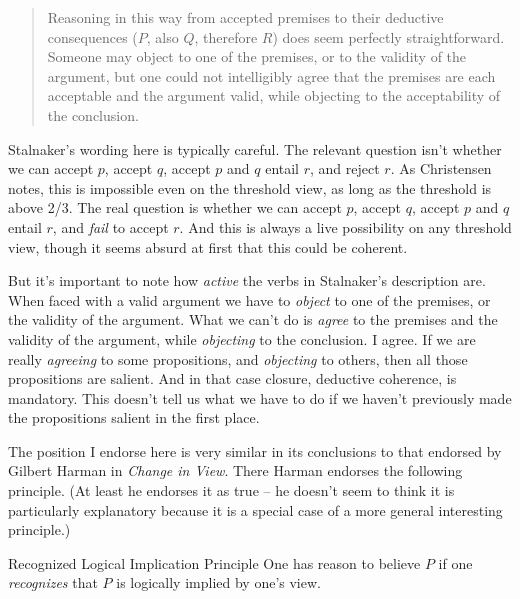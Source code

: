 \begin{quote}
Reasoning in this way from accepted premises to their deductive consequences (\(P\), also \(Q\), therefore \(R\)) does seem perfectly straightforward. Someone may object to one of the premises, or to the validity of the argument, but one could not intelligibly agree that the premises are each acceptable and the argument valid, while objecting to the acceptability of the conclusion. \cite[92]{Stalnaker1984}
\end{quote}

\noindent Stalnaker's wording here is typically careful. The relevant question isn't whether we can accept \(p\), accept \(q\), accept \(p\) and \(q\) entail \(r\), and reject \(r\). As Christensen \citeyearpar[Ch. 4]{Christensen2005} notes, this is impossible even on the threshold view, as long as the threshold is above 2/3. The real question is whether we can accept \(p\), accept \(q\), accept \(p\) and \(q\) entail \(r\), and \textit{fail }to accept \(r\). And this is always a live possibility on any threshold view, though it seems absurd at first that this could be coherent.

But it's important to note how \textit{active} the verbs in Stalnaker's description are. When faced with a valid argument we have to \textit{object} to one of the premises, or the validity of the argument. What we can't do is \textit{agree} to the premises and the validity of the argument, while \textit{objecting} to the conclusion. I agree. If we are really \textit{agreeing} to some propositions, and \textit{objecting} to others, then all those propositions are salient. And in that case closure, deductive coherence, is mandatory. This doesn't tell us what we have to do if we haven't previously made the propositions salient in the first place.

The position I endorse here is very similar in its conclusions to that endorsed by Gilbert Harman in \textit{Change in View}. There Harman endorses the following principle. (At least he endorses it as true -- he doesn't seem to think it is particularly explanatory because it is a special case of a more general interesting principle.)

\begin{description*}
\item[Recognized Logical Implication Principle] One has reason to believe \(P\) if one \textit{recognizes} that \(P\) is logically implied by one's view. \cite[17]{Harman1986}
\end{description*}

